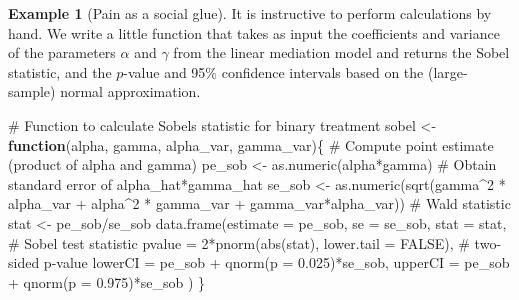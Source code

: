 \documentclass[
  11pt,
  letterpaper,
]{scrbook}
\newenvironment{Shaded}{\begin{snugshade}}{\end{snugshade}}
\newcommand{\AttributeTok}[1]{\textcolor[rgb]{0.40,0.45,0.13}{#1}}
\newcommand{\CommentTok}[1]{\textcolor[rgb]{0.37,0.37,0.37}{#1}}
\newcommand{\ConstantTok}[1]{\textcolor[rgb]{0.56,0.35,0.01}{#1}}
\newcommand{\ControlFlowTok}[1]{\textcolor[rgb]{0.00,0.23,0.31}{\textbf{#1}}}
\newcommand{\DecValTok}[1]{\textcolor[rgb]{0.68,0.00,0.00}{#1}}
\newcommand{\FloatTok}[1]{\textcolor[rgb]{0.68,0.00,0.00}{#1}}
\newcommand{\FunctionTok}[1]{\textcolor[rgb]{0.28,0.35,0.67}{#1}}
\newcommand{\NormalTok}[1]{\textcolor[rgb]{0.00,0.23,0.31}{#1}}
\newcommand{\OtherTok}[1]{\textcolor[rgb]{0.00,0.23,0.31}{#1}}
\newcommand{\SpecialCharTok}[1]{\textcolor[rgb]{0.37,0.37,0.37}{#1}}
\theoremstyle{definition}
\theoremstyle{definition}
\newtheorem{example}{Example}[chapter]
\theoremstyle{remark}
\begin{document}
\begin{example}[Pain as a social
glue]
It is instructive to perform calculations by hand. We write a little
function that takes as input the coefficients and variance of the
parameters \(\alpha\) and \(\gamma\) from the linear mediation model and
returns the Sobel statistic, and the \(p\)-value and 95\% confidence
intervals based on the (large-sample) normal approximation.

\begin{Shaded}
\begin{Highlighting}[]
\CommentTok{\# Function to calculate Sobel\textquotesingle{}s statistic for binary treatment}
\NormalTok{sobel }\OtherTok{\textless{}{-}} \ControlFlowTok{function}\NormalTok{(alpha, gamma, alpha\_var, gamma\_var)\{}
  \CommentTok{\# Compute point estimate (product of alpha and gamma)}
\NormalTok{  pe\_sob }\OtherTok{\textless{}{-}} \FunctionTok{as.numeric}\NormalTok{(alpha}\SpecialCharTok{*}\NormalTok{gamma)}
  \CommentTok{\# Obtain standard error of alpha\_hat*gamma\_hat}
\NormalTok{  se\_sob }\OtherTok{\textless{}{-}} \FunctionTok{as.numeric}\NormalTok{(}\FunctionTok{sqrt}\NormalTok{(gamma}\SpecialCharTok{\^{}}\DecValTok{2} \SpecialCharTok{*}\NormalTok{ alpha\_var }\SpecialCharTok{+}\NormalTok{ alpha}\SpecialCharTok{\^{}}\DecValTok{2} \SpecialCharTok{*}\NormalTok{ gamma\_var  }\SpecialCharTok{+}\NormalTok{ gamma\_var}\SpecialCharTok{*}\NormalTok{alpha\_var))}
  \CommentTok{\# Wald statistic}
\NormalTok{  stat }\OtherTok{\textless{}{-}}\NormalTok{ pe\_sob}\SpecialCharTok{/}\NormalTok{se\_sob}
  \FunctionTok{data.frame}\NormalTok{(}\AttributeTok{estimate =}\NormalTok{ pe\_sob,}
             \AttributeTok{se =}\NormalTok{ se\_sob,}
             \AttributeTok{stat =}\NormalTok{ stat, }\CommentTok{\# Sobel test statistic}
             \AttributeTok{pvalue =} \DecValTok{2}\SpecialCharTok{*}\FunctionTok{pnorm}\NormalTok{(}\FunctionTok{abs}\NormalTok{(stat), }\AttributeTok{lower.tail =} \ConstantTok{FALSE}\NormalTok{), }\CommentTok{\# two{-}sided p{-}value}
             \AttributeTok{lowerCI =}\NormalTok{ pe\_sob }\SpecialCharTok{+} \FunctionTok{qnorm}\NormalTok{(}\AttributeTok{p =} \FloatTok{0.025}\NormalTok{)}\SpecialCharTok{*}\NormalTok{se\_sob,}
             \AttributeTok{upperCI =}\NormalTok{ pe\_sob }\SpecialCharTok{+} \FunctionTok{qnorm}\NormalTok{(}\AttributeTok{p =} \FloatTok{0.975}\NormalTok{)}\SpecialCharTok{*}\NormalTok{se\_sob}
\NormalTok{  )}
\NormalTok{\}}


\end{Highlighting}
\end{Shaded}
\end{example}
\end{document}
